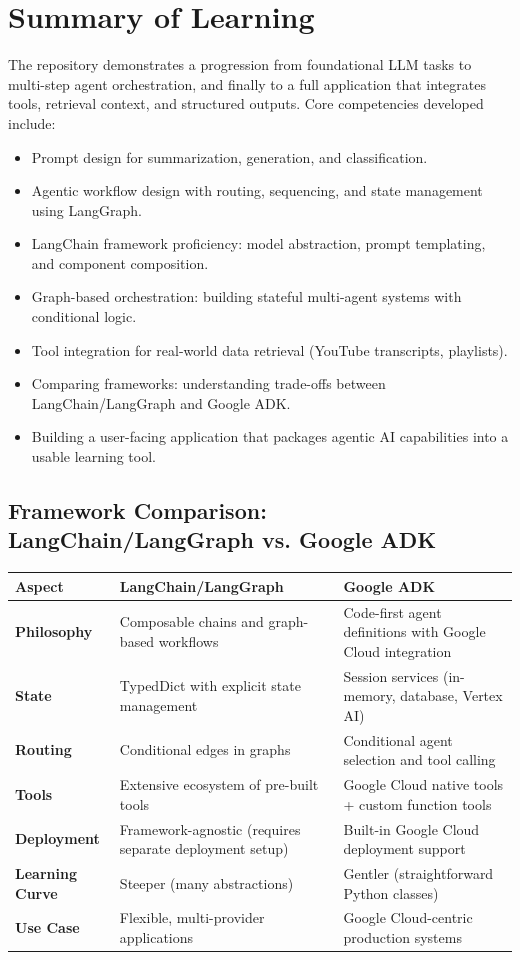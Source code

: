 \documentclass[11pt]{article}
\begin{document}
\section{Summary of Learning}
The repository demonstrates a progression from foundational LLM tasks to multi-step agent orchestration, and finally to a full application that integrates tools, retrieval context, and structured outputs. Core competencies developed include:
\begin{itemize}[leftmargin=2em]
    \item Prompt design for summarization, generation, and classification.
    \item Agentic workflow design with routing, sequencing, and state management using LangGraph.
    \item LangChain framework proficiency: model abstraction, prompt templating, and component composition.
    \item Graph-based orchestration: building stateful multi-agent systems with conditional logic.
    \item Tool integration for real-world data retrieval (YouTube transcripts, playlists).
    \item Comparing frameworks: understanding trade-offs between LangChain/LangGraph and Google ADK.
    \item Building a user-facing application that packages agentic AI capabilities into a usable learning tool.
\end{itemize}

\subsection{Framework Comparison: LangChain/LangGraph vs. Google ADK}
\begin{longtable}{p{}p{}p{}}
\toprule
\textbf{Aspect} & \textbf{LangChain/LangGraph} & \textbf{Google ADK} \\
\midrule
\textbf{Philosophy} & Composable chains and graph-based workflows & Code-first agent definitions with Google Cloud integration \\
\textbf{State} & TypedDict with explicit state management & Session services (in-memory, database, Vertex AI) \\
\textbf{Routing} & Conditional edges in graphs & Conditional agent selection and tool calling \\
\textbf{Tools} & Extensive ecosystem of pre-built tools & Google Cloud native tools + custom function tools \\
\textbf{Deployment} & Framework-agnostic (requires separate deployment setup) & Built-in Google Cloud deployment support \\
\textbf{Learning Curve} & Steeper (many abstractions) & Gentler (straightforward Python classes) \\
\textbf{Use Case} & Flexible, multi-provider applications & Google Cloud-centric production systems \\
\bottomrule
\end{longtable}
\end{document}

